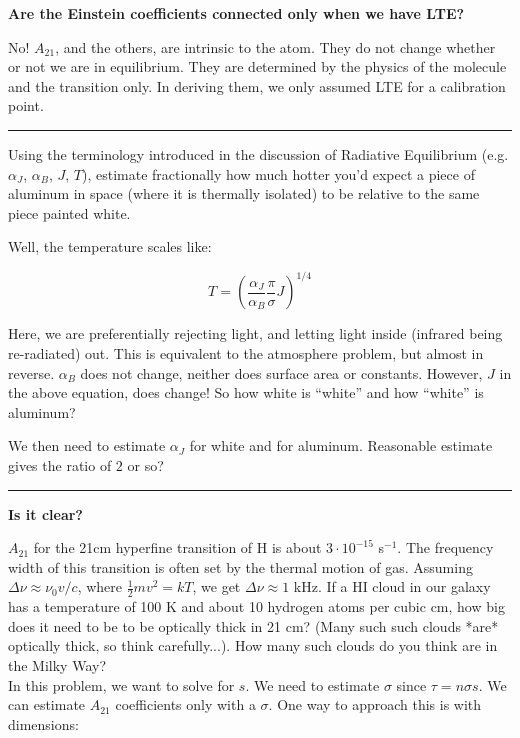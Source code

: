 \documentclass{article}
\begin{document}
\textbf{Are the Einstein coefficients connected only when we have LTE?}

No! $A_{21}$, and the others, are intrinsic to the atom. They do not change whether or not we are in equilibrium. They are determined by the physics of the molecule and the transition only. In deriving them, we only assumed LTE for a calibration point. 

\par\noindent\rule{\textwidth}{0.4pt}

Using the terminology introduced in the discussion of Radiative Equilibrium (e.g. $\alpha_J$,
$\alpha_B$, $J$, $T$), estimate fractionally how much hotter you'd expect a piece of aluminum in space (where
it is thermally isolated) to be relative to the same piece painted white.

Well, the temperature scales like:

\begin{equation}
    \boxed{T = \left(\frac{\alpha_J}{\alpha_B} \frac{\pi}{\sigma} J\right)^{1/4}}
\end{equation}

Here, we are preferentially rejecting light, and letting light inside (infrared being re-radiated) out. This is equivalent to the atmosphere problem, but almost in reverse. $\alpha_B$ does not change, neither does surface area or constants. However, $J$ in the above equation, does change! So how white is ``white'' and how ``white'' is aluminum?

We then need to estimate $\alpha_J$ for white and for aluminum. Reasonable estimate gives the ratio of $2$ or so?

\par\noindent\rule{\textwidth}{0.4pt}
\textbf{Is it clear?}

$A_{21}$ for the 21cm hyperfine transition of H is about $3\cdot 10^{-15}$ s$^{-1}$.  The 
frequency width of this transition is often set by the thermal motion of gas. Assuming
$\Delta\nu\approx \nu_0 v/c$, where $\frac12 mv^2=kT$, we get $\Delta\nu\approx1$ kHz.
If a 
HI cloud in our galaxy has a temperature of 100 K and about 10 hydrogen atoms per
cubic cm, how big does it need to be to be optically thick in 21 cm?  (Many such such clouds
*are* optically thick, so think carefully...).  How many such clouds do you think are
in the Milky Way?\\

In this problem, we want to solve for $s$. We need to estimate $\sigma$ since $\tau = n \sigma s$. We can estimate $A_{21}$ coefficients only with a $\sigma$. One way to approach this is with dimensions:
\end{document}
